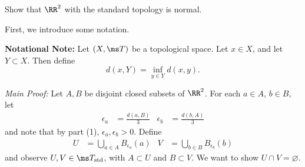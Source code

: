 \documentclass{fkpset}
\newcommand{\tstd}{\ensuremath \ms T_{\rm std}}
\begin{document}
\pagestyle{plain}
\pagestyle{fancy}
  \pointstable{}

  \vspace{1cm}

  \begin{problem}[5.6(4)]
    Show that $\RR^2$ with the standard topology is normal.
  \end{problem}
  \begin{solution}
    First, we introduce some notation.
    \begin{leftbar}
      \textbf{Notational Note:} Let $(X, \ms T)$ be a topological
      space. Let $x \in X$, and let $Y \subset X$. Then define
      \[
        d(x, Y) = \inf_{y \in Y} d(x,y).
      \]
    \end{leftbar}

    \emph{Main Proof:} Let $A,B$ be disjoint closed subsets of
    $\RR^2$. For each $a\in A$, $b\in B$, let
    \begin{align*}
      \epsilon_a &= \frac{d(a,B)}{3} & \epsilon_b &= \frac{d(b,A)}{3}
    \end{align*}
    and note that by part (1), $\epsilon_a, \epsilon_b > 0$. Define
    \begin{align*}
      U &= \bigcup_{a \in A} B_{\epsilon_a}(a) & V &= \bigcup_{b \in B} B_{\epsilon_b}(b)
    \end{align*}
    and observe $U, V \in \tstd$, with $A \subset U$ and $B \subset
    V$. We want to show $U \cap V = \varnothing$.


\end{solution}
\end{document}
